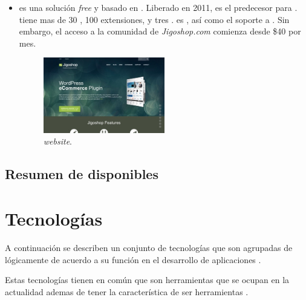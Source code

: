 \begin{itemize}
	\item \textbf{\nameJigoshop} es una solución \ecommerce \textit{free} y \opensource basado en \wordPress. Liberado en 2011, \nameJigoshop es el predecesor para \nameWooCommerce. \nameJigoshop tiene mas de 30   \themes, 100 extensiones, y tres \theme \frameworks. \nameJigoshop es  \free, así como el soporte a \wordPressOrg. Sin embargo, el acceso a la comunidad de \textit{Jigoshop.com} comienza desde \$40 por mes.

	\begin{figure}[H]
		\centering
		\includegraphics[width=0.5\textwidth]{figuras/cap1/JigoshopWebsite.jpg}
		\caption{\nameJigoshop \textit{website}\cite{online_Jigoshop}.}
	\end{figure}

\end{itemize}


\subsection{Resumen de \frameworks disponibles}



\section{Tecnologías }\label{cap:estadoArte:tecnologias}
A continuación se describen un conjunto de tecnologías que son agrupadas de lógicamente de acuerdo a su función en el desarrollo de aplicaciones \web.

Estas tecnologías tienen en común que son herramientas que se ocupan en la actualidad ademas de tener la característica de ser herramientas \opensource. 

